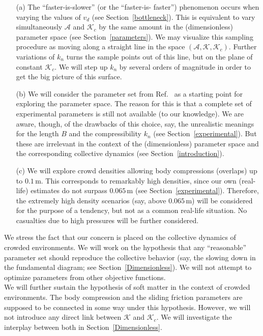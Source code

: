 \documentclass[preprint,12pt]{elsarticle}
\begin{document}
\begin{itemize}  \item[(a)] The ``faster-is-slower'' (or the ``faster-is-
faster'') phenomenon  occurs when varying the values of $v_d$ (see
Section~\ref{bottleneck}). This is  equivalent to vary simultaneously
$\mathcal{A}$ and $\mathcal{K}_c$ by the same  amount in the (dimensionless)
parameter space (see Section~\ref{parameters}). We  may visualize this sampling
procedure as moving along a straight line in the  space
$(\mathcal{A},\mathcal{K},\mathcal{K}_c)$. Further variations of  $k_n$ turns
the sample points out of this line, but on the plane of constant
$\mathcal{K}_c$. We will step up $k_n$ by several orders of magnitude in order
to get the big picture of this surface.

\item[(b)] We will consider the parameter set from Ref.~\cite{helbing_2000}  as
a starting point for exploring the parameter space. The reason for this is  that
a complete set of experimental parameters is still not available (to our
knowledge). We are aware, though, of the drawbacks of this choice, say, the
unrealistic meanings for the length $B$ and the compressibility $k_n$ (see
Section~\ref{experimental}). But these are irrelevant in the context of the
(dimensionless) parameter space and the corresponding collective dynamics (see
Section~\ref{introduction}).

\item[(c)] We will explore crowd densities allowing body compressions (overlaps)
up to $0.1\,$m. This corresponds to remarkably high densities, since our own
(real- life) estimates do not surpass $0.065\,$m (see
Section~\ref{experimental}). Therefore, the extremely high density  scenarios
(say, above $0.065\,$m) will be considered for the purpose of a  tendency, but
not as a common real-life situation. No casualties due to high  pressures will
be further considered.

\end{itemize}

We stress the fact that our concern is placed on the collective dynamics of
crowded environments. We will work on the hypothesis that any ``reasonable''
parameter set should reproduce the collective behavior (say, the slowing down in
the fundamental diagram; see Section~\ref{Dimensionless}). We will not attempt
to optimize parameters from other objective functions. \\

We will further sustain the hypothesis of soft matter in the context of crowded
environments. The body compression and the sliding friction parameters are
supposed to be connected in some way under this hypothesis. However, we will not
introduce any direct link between $\mathcal{K}$ and $\mathcal{K}_c$. We will
investigate the interplay between both in Section~\ref{Dimensionless}.\\
\end{document}
